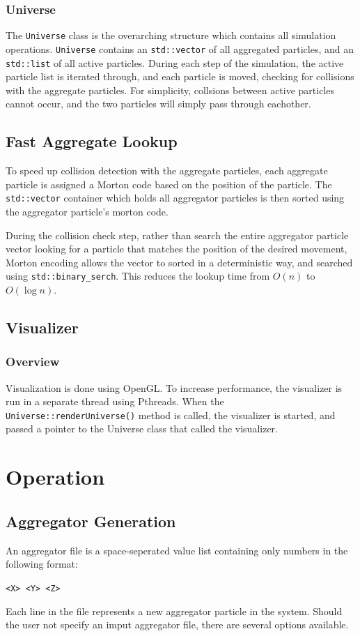 \documentclass[fleqn,10pt]{SelfArx} %
\begin{document}
\subsubsection{Universe}
The \texttt{Universe} class is the overarching structure which contains all simulation operations. \texttt{Universe} contains an \texttt{std\allowbreak::vector} of all aggregated particles, and an \texttt{std\allowbreak::list} of all active particles. During each step of the simulation, the active particle list is iterated through, and each particle is moved, checking for collisions with the aggregate particles. For simplicity, collsions between active particles cannot occur, and the two particles will simply pass through eachother. 

\subsection{Fast Aggregate Lookup}
To speed up collision detection with the aggregate particles, each aggregate particle is assigned a Morton code based on the position of the particle. The \texttt{std\allowbreak::vector} container which holds all aggregator particles is then sorted using the aggregator particle's morton code.

During the collision check step, rather than search the entire aggregator particle vector looking for a particle that matches the position of the desired movement, Morton encoding allows the vector to sorted in a deterministic way, and searched using \texttt{std\allowbreak::binary\_serch}. This reduces the lookup time from $O(n)$ to $O(\log n)$.
\subsection{Visualizer}
\subsubsection{Overview}
Visualization is done using OpenGL. To increase performance, the visualizer is run in a separate thread using Pthreads. When the \texttt{Universe\allowbreak::renderUniverse()} method is called, the visualizer is started, and passed a pointer to the Universe class that called the visualizer.



\section{Operation}
\subsection{Aggregator Generation}
An aggregator file is a space-seperated value list containing only numbers in the following format:
\begin{center}
    \texttt{<X> <Y> <Z>}
\end{center}
Each line in the file represents a new aggregator particle in the system. Should the user not specify an imput aggregator file, there are several options available.
\end{document}
